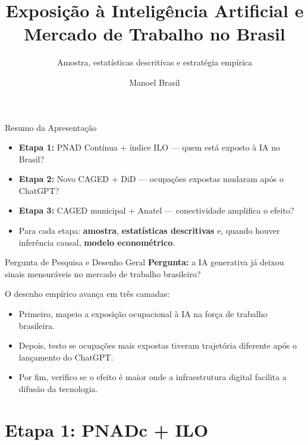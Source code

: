 \documentclass[
  ignorenonframetext,
  aspectratio=169,
]{beamer}
\title{Exposição à Inteligência Artificial e Mercado de Trabalho no
Brasil}
\subtitle{Amostra, estatísticas descritivas e estratégia empírica}
\author{Manoel Brasil}
\date{}
\institute{Orientadora: Profa. Danyelle Karine Santos Branco\newline 14
de Maio}
\providecommand{\tightlist}{%
  \setlength{\itemsep}{0pt}\setlength{\parskip}{0pt}}
\begin{document}
\frame{\titlepage}


\begin{frame}{Resumo da Apresentação}
\label{resumo-da-apresentauxe7uxe3o}
\begin{itemize}
\tightlist
\item
  \textbf{Etapa 1:} PNAD Contínua + índice ILO --- quem está exposto à
  IA no Brasil?
\item
  \textbf{Etapa 2:} Novo CAGED + DiD --- ocupações expostas mudaram após
  o ChatGPT?
\item
  \textbf{Etapa 3:} CAGED municipal + Anatel --- conectividade amplifica
  o efeito?
\item
  Para cada etapa: \textbf{amostra}, \textbf{estatísticas descritivas}
  e, quando houver inferência causal, \textbf{modelo econométrico}.
\end{itemize}
\end{frame}

\begin{frame}{Pergunta de Pesquisa e Desenho Geral}
\label{pergunta-de-pesquisa-e-desenho-geral}
\textbf{Pergunta:} a IA generativa já deixou sinais mensuráveis no
mercado de trabalho brasileiro?

O desenho empírico avança em três camadas:

\begin{itemize}
\tightlist
\item
  Primeiro, mapeio a exposição ocupacional à IA na força de trabalho
  brasileira.
\item
  Depois, testo se ocupações mais expostas tiveram trajetória diferente
  após o lançamento do ChatGPT.
\item
  Por fim, verifico se o efeito é maior onde a infraestrutura digital
  facilita a difusão da tecnologia.
\end{itemize}
\end{frame}

\section{Etapa 1: PNADc + ILO}\label{etapa-1-pnadc-ilo}
\end{document}
